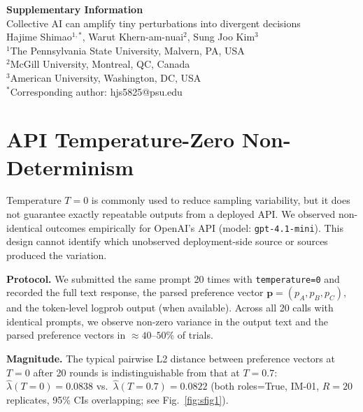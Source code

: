 \documentclass[11pt,onecolumn]{article}
\newcommand{\lam}{\ensuremath{\hat{\lambda}}}
\begin{document}
\begin{center}
  {\LARGE \textbf{Supplementary Information}}\\[6pt]
  {\Large Collective AI can amplify tiny perturbations into divergent decisions}\\[4pt]
  {\normalsize Hajime Shimao$^{1,*}$, Warut Khern-am-nuai$^{2}$, Sung Joo Kim$^{3}$}\\[2pt]
  {\small $^{1}$The Pennsylvania State University, Malvern, PA, USA}\\
  {\small $^{2}$McGill University, Montreal, QC, Canada}\\[2pt]
  {\small $^{3}$American University, Washington, DC, USA}\\[2pt]
  {\small $^{*}$Corresponding author: hjs5825@psu.edu}
\end{center}

\tableofcontents
\vspace{10pt}

\section{API Temperature-Zero Non-Determinism}
\label{sec:S1-nondeterminism}

Temperature $T = 0$ is commonly used to reduce sampling variability, but it
does not guarantee exactly repeatable outputs from a deployed API. We observed
non-identical outcomes empirically for OpenAI's API (model:
\texttt{gpt-4.1-mini}). This design cannot identify which unobserved
deployment-side source or sources produced the variation.

\textbf{Protocol.}
We submitted the same prompt 20 times with \texttt{temperature=0} and recorded
the full text response, the parsed preference vector
$\mathbf{p} = (p_A, p_B, p_C)$, and the token-level logprob output (when
available). Across all 20 calls with identical prompts, we observe non-zero
variance in the output text and the parsed preference vectors in
$\approx 40\text{--}50\%$ of trials.

\textbf{Magnitude.}
The typical pairwise L2 distance between preference vectors at $T = 0$ after
20 rounds is indistinguishable from that at $T = 0.7$:
$\lam(T{=}0) = 0.0838$ vs.\ $\lam(T{=}0.7) = 0.0822$ (both roles=True,
IM-01, $R=20$ replicates, 95\% CIs overlapping; see Fig.~\ref{fig:sfig1}).
\end{document}
